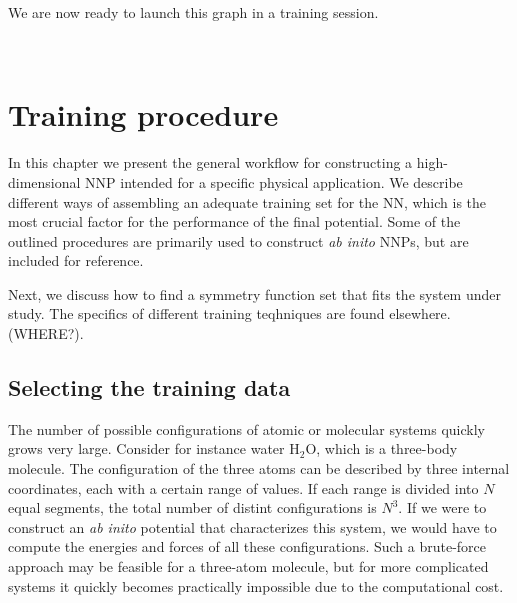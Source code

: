 \documentclass[twoside,english]{uiofysmaster}
\begin{document}
We are now ready to launch this graph in a training session. 
\begin{lstlisting}[language=Python]
 	
\end{lstlisting}


\chapter{Training procedure}
In this chapter we present the general workflow for constructing a high-dimensional NNP 
intended for a specific physical application. We describe different ways of assembling 
an adequate training set for the NN, which is the most crucial factor for the performance of 
the final potential. Some of the outlined procedures are primarily used to construct 
\textit{ab inito} NNPs, but are included for reference. 

Next, we discuss how to find a symmetry function set that fits the system under study. 
The specifics of different training teqhniques are found elsewhere. (WHERE?).


\section{Selecting the training data}
The number of possible configurations of atomic or molecular systems quickly grows very large. 
Consider for instance water $\textrm{H}_2\textrm{O}$, which is a three-body molecule. The configuration of the
three atoms can be described by three internal coordinates, each with a certain range of values. 
If each range is divided into $N$ equal segments, the total number of distint configurations is $N^3$. 
If we were to construct an \textit{ab inito} potential that characterizes this system, we would have to compute the energies 
and forces of all these configurations. 
Such a brute-force approach may be feasible for a three-atom molecule, but for more complicated systems
it quickly becomes practically impossible due to the computational cost. 
\end{document}
